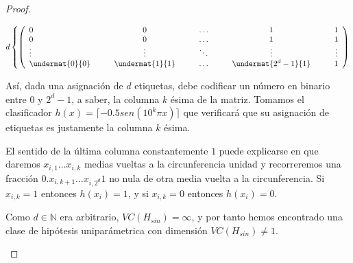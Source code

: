 \begin{proof}
\begin{enumerate}[i]
% 

    
  \[d \left\{\left( 
    \begin{array}{lcccccccccccc}
    0 &&& 0 &&& \ldots &&& 1 &&& 1\\
    0 &&& 0 &&& \ldots &&& 1 &&& 1\\
    \vdots &&& \vdots &&& \ddots &&& \vdots &&& \vdots\\
    \undermat{0}{0} &&& \undermat{1}{1} &&& \ldots &&& \undermat{2^d-1}{1} &&& 1
    \end{array}
  \right)\right.\]
  
  \bigskip
  
  
  Así, dada una asignación de $d$ etiquetas, debe codificar un número en binario entre $0$ y $2^d-1$, a saber, 
  la columna $k$ ésima de la matriz. Tomamos el clasificador $h(x) = \lceil -0.5 sen(10^k \pi x) \rceil$ que verificará
  que su asignación de etiquetas es justamente la columna $k$ ésima. 
  
  El sentido de la última columna constantemente $1$
  puede explicarse en que daremos $x_{i,1} \ldots x_{i,k}$ medias vueltas a la circunferencia unidad y recorreremos
  una fracción $0.x_{i,k+1} \ldots x_{i, 2^d} 1$ no nula de otra media vuelta a la circunferencia. Si 
  $x_{i,k} = 1$ entonces $h(x_i) = 1$, y si $x_{i,k}=0$ entonces $h(x_i) = 0$. 
  
  Como $d\in \mathbb{N}$ era arbitrario, $VC(H_{sin}) = \infty$, y por tanto hemos encontrado una clase de hipótesis 
  uniparámetrica con dimensión $VC(H_{sin})\neq 1$.
 \end{enumerate}
\end{proof}


